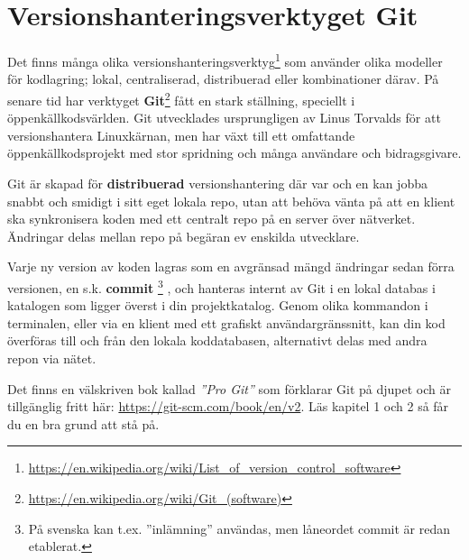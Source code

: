 \section{Versionshanteringsverktyget Git}

Det finns många olika versionshanteringsverktyg\footnote{\href{https://en.wikipedia.org/wiki/List_of_version_control_software}{https://en.wikipedia.org/wiki/List\_of\_version\_control\_software}}
 som använder olika modeller för kodlagring; lokal, centraliserad, distribuerad eller kombinationer därav. 
På senare tid har verktyget \textbf{Git}\footnote{\href{https://en.wikipedia.org/wiki/Git_(software)}{https://en.wikipedia.org/wiki/Git\_(software)}} fått en stark ställning, speciellt i öppenkällkodsvärlden. Git utvecklades ursprungligen av Linus Torvalds för att versionshantera Linuxkärnan, men har växt till ett omfattande öppenkällkodsprojekt med stor spridning och många användare och bidragsgivare. 

Git är skapad för \textbf{distribuerad} versionshantering där var och en kan jobba snabbt och smidigt i sitt eget lokala repo, utan att behöva vänta på att en klient ska synkronisera koden med ett centralt repo på en server över nätverket. Ändringar delas mellan repo på begäran ev enskilda utvecklare. 

Varje ny version av koden lagras som en avgränsad mängd ändringar sedan förra versionen, en s.k. \textbf{commit}%
\footnote{På svenska kan t.ex. ''inlämning'' användas, men låneordet commit är redan etablerat.}%
, och hanteras internt av Git i en lokal databas i katalogen  som ligger överst i din projektkatalog. Genom olika kommandon i terminalen, eller via en klient med ett grafiskt användargränssnitt, kan din kod överföras till och från den lokala koddatabasen, alternativt delas med andra repon via nätet. 

Det finns en välskriven bok kallad \textit{''Pro Git''} som förklarar Git på djupet och är tillgänglig fritt här: 
\url{https://git-scm.com/book/en/v2}.
Läs kapitel 1 och 2 så får du en bra grund att stå på. 

